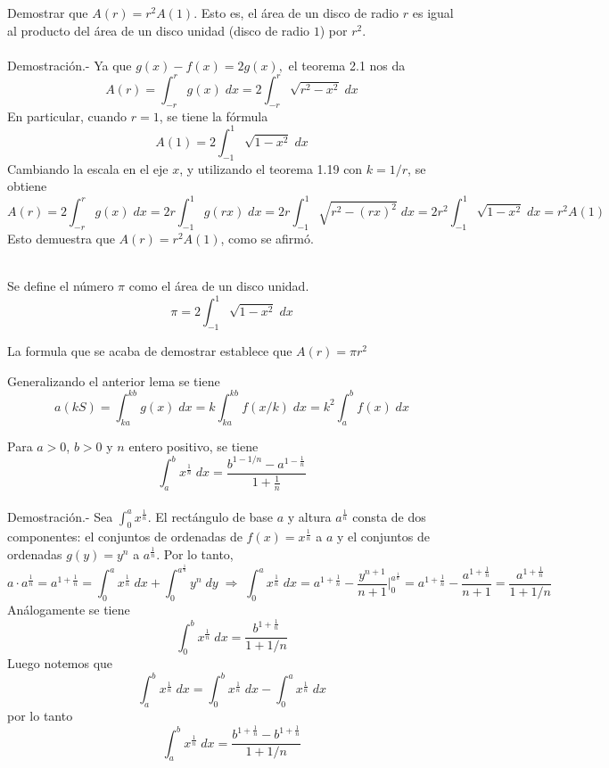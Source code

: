     \begin{lema} Demostrar que $A(r) = r^2 A(1)$. Esto es, el área de un disco de radio $r$ es igual al producto del área de un disco unidad (disco de radio $1$) por $r^2$.\\\\
	Demostración.-\; Ya que $g(x) - f(x) = 2g(x),$ el teorema 2.1 nos da 
	    $$A(r) = \int_{-r}^r g(x) \; dx = 2 \int_{-r}^r \sqrt{r^2 - x^2} \; dx$$
	    En particular, cuando $r = 1$, se tiene la fórmula $$A(1) = 2\int_{-1}^1 \sqrt{1 - x^2} \; dx$$
	    Cambiando la escala en el eje $x$, y utilizando el teorema 1.19 con $k=1/r$, se obtiene
	    $$A(r) = 2\int_{-r}^r g(x) \; dx = 2r \int_{-1}^1 g(rx) \; dx = 2r\int_{-1}^1 \sqrt{r^2 - (rx)^2} \; dx = 2r^2 \int_{-1}^1 \sqrt{1-x^2} \; dx = r^2 A(1)$$
	    Esto demuestra que $A(r) = r^2 A(1)$, como se afirmó.\\\\
    \end{lema}

    \begin{def.} Se define el número $\pi$ como el área de un disco unidad.
	$$\pi = 2 \int_{-1}^1 \sqrt{1-x^2}\; dx$$
    \end{def.}
\begin{center}
    La formula que se acaba de demostrar establece que $A(r) = \pi r^2$\\
\end{center}

Generalizando el anterior lema se tiene 
    $$a(kS) = \int_{ka}^{kb} g(x)\; dx = k \int_{ka}^{kb} f(x/k) \; dx = k^2 \int_a^b f(x) \; dx$$

\begin{teo} Para $a>0$, $b>0$ y $n$ entero positivo, se tiene $$\int_a^b x^{\frac{1}{n}} \; dx = \dfrac{b^{1-1/n} - a^{1-\frac{1}{n}}}{1+\frac{1}{n}}$$\\
    Demostración.-\; Sea $\int_0^a x^{\frac{1}{n}}$. El rectángulo de base $a$ y altura $a^{\frac{1}{n}}$ consta de dos componentes: el conjuntos de ordenadas de $f(x) = x^{\frac{1}{n}}$ a $a$ y el conjuntos de ordenadas $g(y) = y^n$ a $a^{\frac{1}{n}}$. Por lo tanto,
    $$a\cdot a^{\frac{1}{n}} = a^{1+\frac{1}{n}} = \int_0^a x^{\frac{1}{n}} \; dx + \int_0^{a^{\frac{1}{n}}} y^n \; dy \; \Longrightarrow \; \int_0^a x^{\frac{1}{n}} \; dx = a^{1+\frac{1}{n}} - \dfrac{y^{n+1}}{n+1}\bigg|_0^{a^{\frac{1}{n}}} = a^{1+\frac{1}{n}} -  \dfrac{a^{1+\frac{1}{n}}}{n+1} = \dfrac{a^{1+\frac{1}{n}}}{1 + 1/n}$$
    Análogamente se tiene $$\int_0^b x^{\frac{1}{n}}\; dx = \dfrac{b^{1 + \frac{1}{n}}}{1 + 1/n}$$
    Luego notemos que $$\int_a^b x^{\frac{1}{n}} \; dx = \int_0^b x^{\frac{1}{n}}\; dx - \int_0^a x^{\frac{1}{n}} \;dx$$
    por lo tanto $$\int_a^b x^{\frac{1}{n}}\; dx = \dfrac{b^{1+\frac{1}{n}} - b^{1 + \frac{1}{n}}}{1 + 1/n}$$\\\\
\end{teo}



